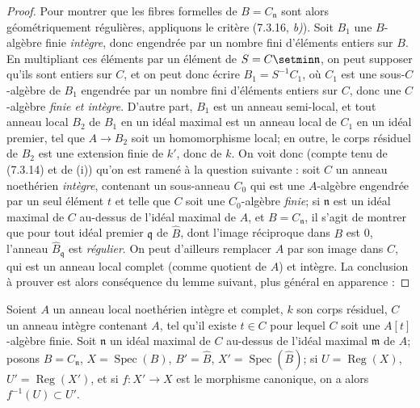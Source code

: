 \begin{proof}
Pour montrer que les fibres formelles de $B=C_{\mathfrak n}$ sont alors
géométriquement régulières, appliquons le critère (7.3.16, \emph{b)}). Soit $B_1$
une $B$-algèbre finie \emph{intègre}, donc engendrée par un nombre fini
d'éléments entiers sur $B$. En multipliant ces éléments par un élément de
$S=C\setmin\mathfrak n$, on peut supposer qu'ils sont entiers sur $C$, et on peut
donc écrire $B_1=S^{-1}C_1$, où $C_1$ est une sous-$C$-algèbre de $B_1$
engendrée par un nombre fini d'éléments entiers sur $C$, donc une
$C$-algèbre \emph{finie et intègre}. D'autre part, $B_1$ est un anneau
semi-local, et tout anneau local $B_2$ de $B_1$ en un idéal maximal est un
anneau local de $C_1$ en un idéal premier, tel que $A\to B_2$ soit un
homomorphisme local; en outre, le corps résiduel de $B_2$ est une extension
finie de $k'$, donc de $k$. On voit donc (compte tenu de (7.3.14) et de (i))
qu'on est ramené à la question suivante : soit $C$ un anneau noethérien
\emph{intègre}, contenant un sous-anneau $C_0$ qui est une $A$-algèbre
engendrée par un seul élément $t$ et telle que $C$ soit une $C_0$-algèbre
\emph{finie}; si $\mathfrak n$ est un idéal maximal de $C$
au-dessus de l'idéal maximal de $A$, et $B=C_{\mathfrak n}$, il s'agit de
montrer que pour tout idéal premier $\mathfrak q$ de $\widehat B$, dont
l'image réciproque dans $B$ est 0, l'anneau
$\widehat B_{\mathfrak q}$ est \emph{régulier}. On peut d'ailleurs remplacer
$A$ par son image dans $C$, qui est un anneau local complet (comme quotient
de $A$) et intègre. La conclusion à prouver est alors conséquence du lemme
suivant, plus général en apparence :
\end{proof}

\begin{lemma}[7.4.4.2]
\label{IV.2.s7.4.4.2-fr}
Soient $A$ un anneau local noethérien intègre et complet, $k$ son corps
résiduel, $C$ un anneau intègre contenant $A$, tel qu'il existe $t\in C$
pour lequel $C$ soit une $A[t]$-algèbre finie. Soit $\mathfrak n$ un idéal
maximal de $C$ au-dessus de l'idéal maximal $\mathfrak m$ de $A$; posons
$B=C_{\mathfrak n}$, $X=\operatorname{Spec}(B)$,
$B'=\widehat B$, $X'=\operatorname{Spec}(\widehat B)$; si
$U=\operatorname{Reg}(X)$, $U'=\operatorname{Reg}(X')$, et si
$f:X'\to X$ est le morphisme canonique, on a alors
$f^{-1}(U)\subset U'$.
\end{lemma}


